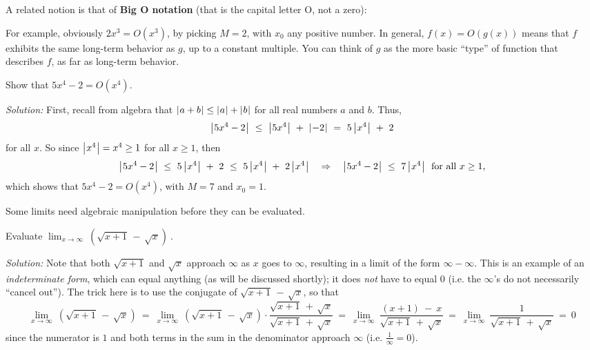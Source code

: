 A related notion is that of \textbf{Big O notation} (that is the capital letter
O, not a zero):


\noindent For example, obviously $2x^3 = O(x^3)$, by picking $M = 2$, with $x_0$
any positive number. In general, $f(x) = O(g(x))$ means that $f$ exhibits the
same long-term behavior as $g$, up to a constant multiple. You can think of $g$
as the more basic ``type'' of function that describes $f$, as far as long-term
behavior.

\begin{exmp}\label{exmp:bigOexmp}
\noindent Show that $5x^4 - 2 = O(x^4)$.\vspace{1mm}
\par\noindent\emph{Solution:} First, recall from algebra that
$\lvert\mspace{1mu}a + b\mspace{1mu}\rvert \le \lvert\mspace{1mu}a\mspace{1mu}\rvert + \lvert\mspace{1mu}b\mspace{1mu}\rvert$ for all real numbers $a$ and $b$. Thus,
\[
\bigl\lvert\mspace{1mu}5x^4 - 2\mspace{1mu}\bigr\rvert ~\le~ \bigl\lvert\mspace{1mu}5x^4\mspace{1mu}\bigr\rvert ~+~ \lvert\mspace{1mu}-2\mspace{1mu}\rvert ~=~ 5\,\bigl\lvert\mspace{1mu}x^4\mspace{1mu}\bigr\rvert ~+~ 2
\]
for all $x$. So since $\bigl\lvert\mspace{1mu}x^4\mspace{1mu}\bigr\rvert = x^4 \ge 1$ for all $x \ge 1$, then
\[
\bigl\lvert\mspace{1mu}5x^4 - 2\mspace{1mu}\bigr\rvert ~\le~ 5\,\bigl\lvert\mspace{1mu}x^4\mspace{1mu}\bigr\rvert ~+~ 2 ~\le~ 5\,\bigl\lvert\mspace{1mu}x^4\mspace{1mu}\bigr\rvert ~+~ 2\,\bigl\lvert\mspace{1mu}x^4\mspace{1mu}\bigr\rvert
\quad\Rightarrow\quad \bigl\lvert\mspace{1mu}5x^4 - 2\mspace{1mu}\bigr\rvert ~\le~ 7\,\bigl\lvert\mspace{1mu}x^4\mspace{1mu}\bigr\rvert ~~\text{for all $x \ge 1$,}
\]
which shows that $5x^4 - 2 = O(x^4)$, with $M= 7$ and $x_0 = 1$.
\end{exmp}
\divider
\newpage
Some limits need algebraic manipulation before they can be evaluated.

\begin{exmp}\label{exmp:liminfminusinf}
\noindent Evaluate $\displaystyle\lim_{x \to \infty}~\left(\sqrt{x + 1} \,-\, \sqrt{x}\right)~$.\vspace{1mm}
\par\noindent\emph{Solution:} Note that both $\sqrt{x + 1}$ and $\sqrt{x}$
approach $\infty$ as $x$ goes to $\infty$, resulting in a limit of the form
$\infty - \infty$. This is an example of an
\emph{indeterminate form}, which can equal anything
(as will be discussed shortly); it does \emph{not} have to equal $0$ (i.e. the
$\infty$'s do not necessarily ``cancel out''). The trick here is to use the
conjugate of $\sqrt{x + 1} \,-\, \sqrt{x}$, so that
\[
\lim_{x \to \infty}~\left(\sqrt{x + 1} \,-\, \sqrt{x}\right) ~=~
\lim_{x \to \infty}~\left(\sqrt{x + 1} \,-\, \sqrt{x}\right) \cdot
\frac{\sqrt{x + 1} \,+\, \sqrt{x}}{\sqrt{x + 1} \,+\, \sqrt{x}}
~=~ \lim_{x \to \infty}~\frac{(x + 1) ~-~ x}{\sqrt{x + 1} \,+\, \sqrt{x}}
~=~ \lim_{x \to \infty}~\frac{1}{\sqrt{x + 1} \,+\, \sqrt{x}}
~=~ 0
\]
since the numerator is $1$ and both terms in the sum in the denominator approach
$\infty$ (i.e. $\frac{1}{\infty} = 0$).
\end{exmp}
\divider
\vspace{3mm}

